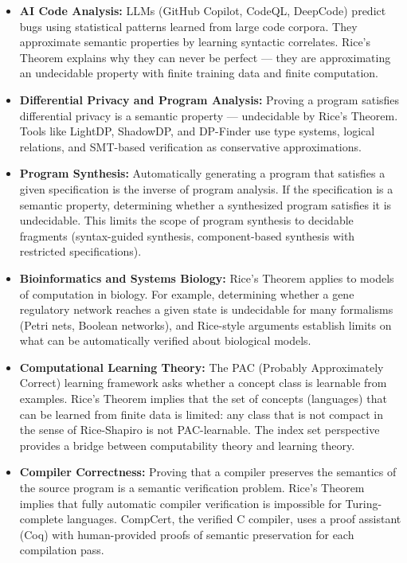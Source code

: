 \begin{itemize}
\item \textbf{AI Code Analysis:} LLMs (GitHub Copilot, CodeQL, DeepCode) predict bugs using statistical patterns learned from large code corpora. They approximate semantic properties by learning syntactic correlates. Rice's Theorem explains why they can never be perfect --- they are approximating an undecidable property with finite training data and finite computation.

\item \textbf{Differential Privacy and Program Analysis:} Proving a program satisfies differential privacy is a semantic property --- undecidable by Rice's Theorem. Tools like LightDP, ShadowDP, and DP-Finder use type systems, logical relations, and SMT-based verification as conservative approximations.

\item \textbf{Program Synthesis:} Automatically generating a program that satisfies a given specification is the inverse of program analysis. If the specification is a semantic property, determining whether a synthesized program satisfies it is undecidable. This limits the scope of program synthesis to decidable fragments (syntax-guided synthesis, component-based synthesis with restricted specifications).

\item \textbf{Bioinformatics and Systems Biology:} Rice's Theorem applies to models of computation in biology. For example, determining whether a gene regulatory network reaches a given state is undecidable for many formalisms (Petri nets, Boolean networks), and Rice-style arguments establish limits on what can be automatically verified about biological models.

\item \textbf{Computational Learning Theory:} The PAC (Probably Approximately Correct) learning framework asks whether a concept class is learnable from examples. Rice's Theorem implies that the set of concepts (languages) that can be learned from finite data is limited: any class that is not compact in the sense of Rice-Shapiro is not PAC-learnable. The index set perspective provides a bridge between computability theory and learning theory.

\item \textbf{Compiler Correctness:} Proving that a compiler preserves the semantics of the source program is a semantic verification problem. Rice's Theorem implies that fully automatic compiler verification is impossible for Turing-complete languages. CompCert, the verified C compiler, uses a proof assistant (Coq) with human-provided proofs of semantic preservation for each compilation pass.


\end{itemize}
